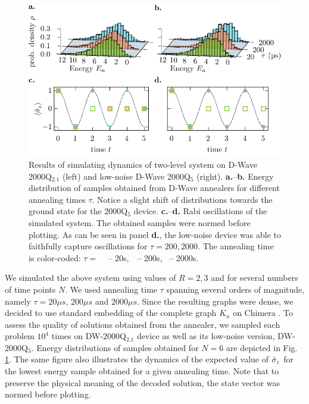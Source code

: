 \begin{figure}[!h]
  \centering
  \includegraphics{figures/parallel-dynamics-result.pdf}
  \caption{Results of simulating dynamics of two-level system on D-Wave 2000Q$_{2.1}$
    (left) and low-noise D-Wave 2000Q$_{5}$ (right). \textbf{a.}--\textbf{b.}
    Energy distribution of samples obtained from D-Wave annealers for different
    annealing times $\tau$. Notice a slight shift of distributions towards the
    ground state for the 2000Q$_{5}$ device. \textbf{c.}--\textbf{d.} Rabi
    oscillations of the simulated system. The obtained samples were normed before
    plotting. As can be seen in panel \textbf{d.}, the low-noise device was able to
    faithfully capture oscillations for $\tau=200, 2000$. The annealing time is
    color-coded: $\tau=$ \tikzquad\,\,\, -- 20\textmu{}s, \,\tikzcircle\,\,\,--
    200\textmu{}s, \,\tikzdot\,\,-- 2000\textmu{}s. } \label{fig:energy-hist}
\end{figure}

We simulated the above system using values of $R=2, 3$ and for several numbers
of time points $N$. We used annealing time $\tau$ spanning several orders of
magnitude, namely $\tau=20\mu s$, $200 \mu s$ and $2000 \mu s$. Since the
resulting graphs were dense, we decided to use standard embedding of the
complete graph $K_n$ on Chimera \cite{chimeraclique}. To assess the quality of
solutions obtained from the annealer, we sampled each problem $10^4$ times on
DW-2000Q$_{2.1}$ device as well as its low-noise version, DW-2000Q$_{5}$.
Energy distributions of samples obtained for $N=6$ are depicted in Fig.
\ref{fig:energy-hist}. The same figure also illustrates the dynamics of the
expected value of $\hat{\sigma}_z$ for the lowest energy sample obtained for a given
annealing time. Note that to preserve the physical meaning of the decoded
solution, the state vector was normed before plotting.

